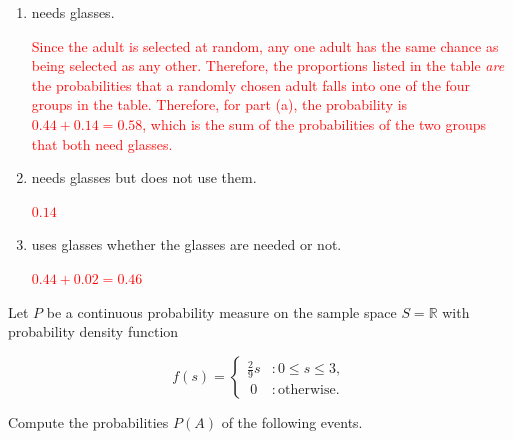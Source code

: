 \documentclass[12pt,reqno]{amsart}
\begin{document}
\medskip
\begin{enumerate}
\item needs glasses.
    
\bigskip
\textcolor{red}{Since the adult is selected at random, any one adult has the same chance as being selected as any other. Therefore, the proportions listed in the table \textit{are} the probabilities that a randomly chosen adult falls into one of the four groups in the table. Therefore, for part (a), the probability is $0.44 + 0.14 = 0.58$, which is the sum of the probabilities of the two groups that both need glasses.}
\bigskip

\item needs glasses but does not use them.
    
\bigskip
\textcolor{red}{$0.14$}
\bigskip

\item uses glasses whether the glasses are needed or not.
    
\bigskip
\textcolor{red}{$0.44+0.02=0.46$}
\bigskip
\end{enumerate}














\bigskip
\prob Let $P$ be a continuous probability measure on the sample space $S=\mathbb{R}$ with probability density function

	\[
	f(s) = \begin{cases}
	\frac{2}{9}s & : 0 \leq s \leq 3, \\\
	0 & : \text{otherwise}.    
	\end{cases}
	\]

Compute the probabilities $P(A)$ of the following events.
\end{document}
